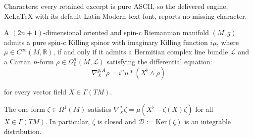 \documentclass[10pt,a4paper]{amsart}
\def\cL{\mathcal{L}}
\renewcommand{\ker}{\mathrm{Ker}}
\begin{document}
Characters: every retained excerpt is pure ASCII, so the delivered engine, XeLaTeX with its default Latin Modern text font, reports no missing character.
\begin{prop}
\label{prop:KillingSpinorBilinear}
A $(2n+1)$-dimensional oriented and spin-c Riemannian manifold $(M,g)$ admits a pure spin-c Killing spinor with imaginary Killing function $i\mu$, where $\mu \in C^\infty(M, \mathbb{R})$, if and only if it admits a Hermitian complex line bundle $\cL$ and a Cartan $n$-form $\rho \in \Omega^n_{\mathbb{C}}(M, \mathcal{L})$ satisfying the differential equation:
\begin{equation}
\label{eq:imaginary-killing-rho}
\nabla^{g,A}_X \rho = i^n \mu \ast (X^\flat \wedge \rho)
\end{equation}

\noindent
for every vector field $X \in \Gamma(TM)$.
\end{prop}

\begin{lemma}\label{lemma:nabla_zeta}
The one-form $\zeta\in\Omega^1(M)$ satisfies $\nabla^g_X\zeta = \mu(X^\flat - \zeta(X)\zeta)$ for all $X\in \Gamma(TM)$. In particular, $\zeta$ is closed and $\mathcal{D} := \ker(\zeta)$ is an integrable distribution.
\end{lemma}
\end{document}
